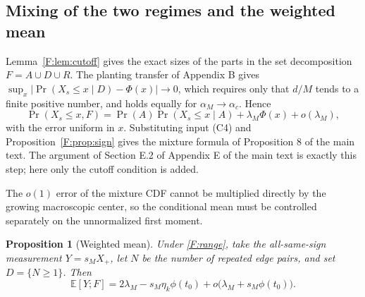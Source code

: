 \documentclass[a4paper,11pt]{article}
\newtheorem{proposition}[theorem]{Proposition}
\numberwithin{equation}{section}
\newcommand{\E}{\mathbb E}
\begin{document}
\subsection{Mixing of the two regimes and the weighted mean}

Lemma~\ref{F:lem:cutoff} gives the exact sizes of the parts in the set decomposition $F=A\cup D\cup R$. The
planting transfer of Appendix B gives $\sup_x|\Pr(X_s\le x\mid D)-\Phi(x)|\to0$, which requires only that
$d/M$ tends to a finite positive number, and holds equally for $\alpha_M\to\alpha_c$. Hence
\[
\Pr(X_s\le x,F)=\Pr(A)\Pr(X_s\le x\mid A)+\lambda_M\Phi(x)+o(\lambda_M),
\]
with the error uniform in $x$. Substituting input (C4) and Proposition~\ref{F:prop:sign} gives the mixture
formula of Proposition 8 of the main text. The argument of Section E.2 of Appendix E of the main text is
exactly this step; here only the cutoff condition is added.

The $o(1)$ error of the mixture CDF cannot be multiplied directly by the growing macroscopic center, so the
conditional mean must be controlled separately on the unnormalized first moment.

\begin{proposition}[Weighted mean]\label{F:prop:wm}
Under \eqref{F:range}, take the all-same-sign measurement $Y=s_MX_+$, let $N$ be the number of repeated edge
pairs, and set $D=\{N\ge1\}$. Then
\begin{equation}
\E[Y;F]=2\lambda_M-s_M\eta_k\phi(t_0)+o\bigl(\lambda_M+s_M\phi(t_0)\bigr).\label{F:wm}
\end{equation}
\end{proposition}
\end{document}
